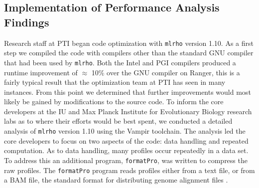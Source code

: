 \documentclass{sig-alternate}
\newcommand{\ty}{\texttt}
\begin{document}
\subsection{Implementation of  Performance Analysis Findings}
Research staff at PTI began code optimization with \texttt{mlrho} version 1.10. As a first step we compiled
the code with compilers other than the standard GNU compiler that had been used by \texttt{mlrho}. Both the
Intel and PGI compilers produced a runtime improvement of $\approx$ 10\% over the GNU compiler on Ranger, this
is a fairly typical result that the optimization team at PTI has seen in many instances. From this point we
determined that further improvements would most likely be gained by modifications to the source code. To
inform the core developers at the IU and Max Planck Institute for Evolutionary Biology research labs as to
where their efforts would be best spent, we conducted a detailed analysis of \texttt{mlrho} version 1.10 using
the Vampir toolchain. The analysis led the core developers to focus on two aspects of the code: data handling
and repeated computation. As to data handling, many profiles occur repeatedly in a data set. To address this
an additional program, \ty{formatPro}, was written to compress the raw profiles. The \ty{formatPro} program reads profiles either from a text
file, or from a BAM file, the  standard format for distributing genome alignment files \citep{li09:seq}. 
\end{document}

